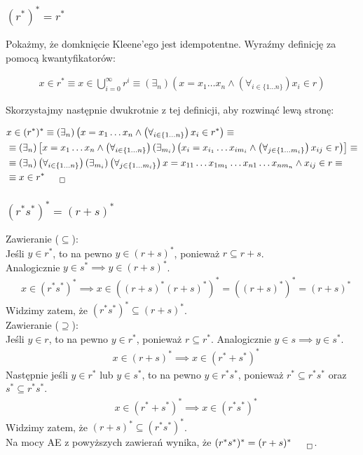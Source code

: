 \documentclass[12pt]{article}
\begin{document}
\subsubsection{$(r^{*})^{*} = r^{*}$}

Pokażmy, że domknięcie Kleene'ego jest idempotentne. Wyraźmy definicję za pomocą kwantyfikatorów:

\begin{align}
    x\in r^{*} \equiv x\in \bigcup_{i=0}^{\infty} r^i \equiv \left(\exists_n\right) 
    \left(x=x_1\dots x_n \land \left(\forall_{i\in \{1\dots n\}}\right) x_i \in r\right)
\end{align}

\noindent
Skorzystajmy następnie dwukrotnie z tej definicji, aby rozwinąć lewą stronę:

\begin{align}
    &x\in (r^{*})^{*} \equiv \left(\exists_n\right)\left(x=x_1\dots x_n \land \left(\forall_{i\in \{1\dots n\}}\right) x_i \in r^{*}\right) \equiv\\
    &\equiv \left(\exists_n\right)\left[x=x_1\dots x_n \land \left(\forall_{i\in \{1\dots n\}}\right) \left(\exists_{m_i}\right) \left(x_i = x_{i_1}\dots x_{im_i} \land \left(\forall_{j\in \{1\dots m_i\}}\right) x_{ij} \in r\right)\right] \equiv\\
    &\equiv \left(\exists_n\right)\left(\forall_{i\in \{1\dots n\}}\right)\left(\exists_{m_i}\right)\left(\forall_{j\in \{1\dots m_i\}}\right) x=x_{11}\dots x_{1m_1}\dots x_{n1}\dots x_{nm_n} \land x_{ij} \in r \equiv\\
    &\equiv x\in r^{*}_{\qed}
\end{align}

\subsubsection{$(r^{*}s^{*})^{*} = (r+s)^{*}$}

Zawieranie ($\subseteq$):\\
\noindent
Jeśli $y\in r^{*}$, to na pewno $y\in (r+s)^{*}$, ponieważ $r \subseteq r+s$.\\ Analogicznie $y\in s^{*} \implies y\in (r+s)^{*}$.
\begin{align}
    &x\in (r^{*}s^{*})^{*} \implies x\in ((r+s)^{*}(r+s)^{*})^{*} = ((r+s)^{*})^{*} = (r+s)^{*}
\end{align}
Widzimy zatem, że $(r^{*}s^{*})^{*} \subseteq (r+s)^{*}$.\\

\noindent
Zawieranie ($\supseteq$):\\
\noindent
Jeśli $y\in r$, to na pewno $y\in r^{*}$, ponieważ $r \subseteq r^{*}$. Analogicznie $y\in s \implies y\in s^{*}$.
\begin{align}
    &x\in (r+s)^{*} \implies x\in (r^{*}+s^{*})^{*}
\end{align}
Następnie jeśli $y\in r^{*}$ lub $y\in s^{*}$, to na pewno $y\in r^{*}s^{*}$, ponieważ $r^{*} \subseteq r^{*}s^{*}$ oraz $s^{*} \subseteq r^{*}s^{*}$.
\begin{align}
    &x\in (r^{*}+s^{*})^{*} \implies x\in (r^{*}s^{*})^{*}
\end{align}
Widzimy zatem, że $(r+s)^{*} \subseteq (r^{*}s^{*})^{*}$.\\

\noindent
Na mocy AE z powyższych zawierań wynika, że $(r^{*}s^{*})^{*} = (r+s)^{*}_{\qed}$.
\end{document}
